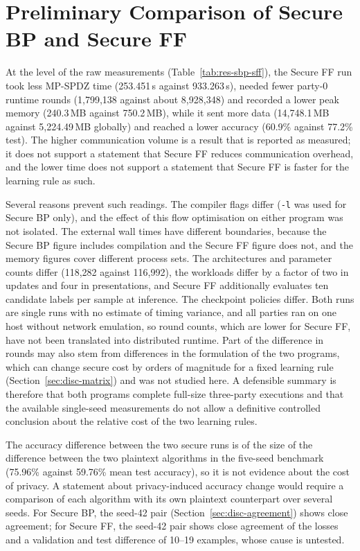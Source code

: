 \section{Preliminary Comparison of Secure BP and Secure FF}\label{sec:disc-compare}
At the level of the raw measurements (Table~\ref{tab:res-sbp-sff}), the Secure FF run took less MP-SPDZ time (253.451\,s against 933.263\,s), needed fewer party-0 runtime rounds (1{,}799{,}138 against about 8{,}928{,}348) and recorded a lower peak memory (240.3\,MB against 750.2\,MB), while it sent more data (14{,}748.1\,MB against 5{,}224.49\,MB globally) and reached a lower accuracy (60.9\% against 77.2\% test). The higher communication volume is a result that is reported as measured; it does not support a statement that Secure FF reduces communication overhead, and the lower time does not support a statement that Secure FF is faster for the learning rule as such.

Several reasons prevent such readings. The compiler flags differ (\texttt{-l} was used for Secure BP only), and the effect of this flow optimisation on either program was not isolated. The external wall times have different boundaries, because the Secure BP figure includes compilation and the Secure FF figure does not, and the memory figures cover different process sets. The architectures and parameter counts differ (118{,}282 against 116{,}992), the workloads differ by a factor of two in updates and four in presentations, and Secure FF additionally evaluates ten candidate labels per sample at inference. The checkpoint policies differ. Both runs are single runs with no estimate of timing variance, and all parties ran on one host without network emulation, so round counts, which are lower for Secure FF, have not been translated into distributed runtime. Part of the difference in rounds may also stem from differences in the formulation of the two programs, which can change secure cost by orders of magnitude for a fixed learning rule (Section~\ref{sec:disc-matrix}) and was not studied here. A defensible summary is therefore that both programs complete full-size three-party executions and that the available single-seed measurements do not allow a definitive controlled conclusion about the relative cost of the two learning rules.

The accuracy difference between the two secure runs is of the size of the difference between the two plaintext algorithms in the five-seed benchmark (75.96\% against 59.76\% mean test accuracy), so it is not evidence about the cost of privacy. A statement about privacy-induced accuracy change would require a comparison of each algorithm with its own plaintext counterpart over several seeds. For Secure BP, the seed-42 pair (Section~\ref{sec:disc-agreement}) shows close agreement; for Secure FF, the seed-42 pair shows close agreement of the losses and a validation and test difference of 10--19 examples, whose cause is untested.

